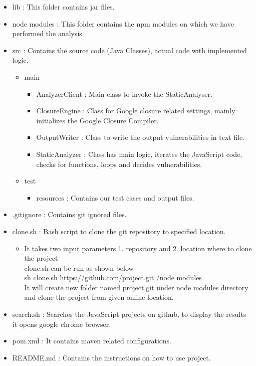 \documentclass[authoryear,preprint]{sigplanconf}
\begin{document}
\begin{itemize}
\item lib : This folder contains jar files.
\item node modules : This folder contains the npm modules on which we have performed the analysis.
\item src : Contains the source code (Java Classes), actual code with implemented logic.
	\begin{itemize}
		\item main
			\begin{itemize}
		\item AnalyzerClient : Main class to invoke the StaticAnalyser.
		\item ClosureEngine : Class for Google closure related settings, mainly initializes the Google Closure Compiler.
		\item OutputWriter : Class to write the output vulnerabilities in text file.
		\item StaticAnalyzer : Class has main logic, iterates the JavaScript code, checks for functions, loops and decides vulnerabilities.\end{itemize}
		
		\item test
			\begin{itemize}
				\item resources : Contains our test cases and output files.
			\end{itemize}
		
	\end{itemize}

\item .gitignore : Contains git ignored files.
\item clone.sh : Bash script to clone the git repository to specified location.
	\begin{itemize}
		\item It takes two input parameters 1. repository and 2. location where to clone the project
		\\
		clone.sh can be run as shown below\\
		
		sh clone.sh https://github.com/project.git /node modules \\
		
		It will create new folder named project.git under node modules directory and clone the project from given online location.
		
	\end{itemize}

\item search.sh : Searches the JavaScript projects on github, to display the results it opens google chrome browser.

\item pom.xml : It contains maven related configurations.
\item README.md : Contains the instructions on how to use project.
		
\end{itemize}
\end{document}
